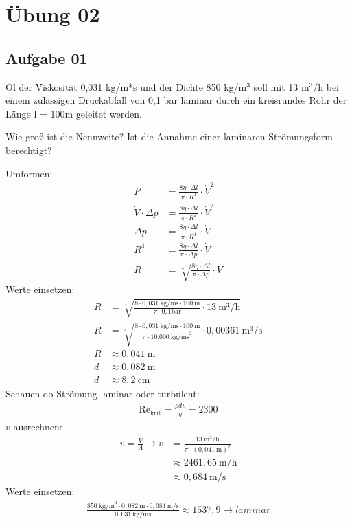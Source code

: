 \documentclass[a4paper,10pt]{article}
\begin{document}
\sidebar
{}
\par \vspace*{5mm}


\section*{Übung 02}
\subsection*{Aufgabe 01}
Öl der Viskosität 0,031 kg/m*s und der Dichte 850 kg/m$^3$ soll mit 13 m$^3$/h bei einem
zulässigen Druckabfall von 0,1 bar laminar durch ein kreisrundes Rohr der Länge
l = 100m geleitet werden. \par 
Wie groß ist die Nennweite? Ist die Annahme einer laminaren Strömungsform
berechtigt?

Umformen:
\begin{align*}
P &= \frac{8 \eta \cdot \Delta l}{\pi \cdot R^4} \cdot \dot{V}^2 \\
\dot{V} \cdot \Delta p &=  \frac{8 \eta \cdot \Delta l}{\pi \cdot R^4} \cdot \dot{V}^2 \\
 \Delta p &=  \frac{8 \eta \cdot \Delta l}{\pi \cdot R^4} \cdot \dot{V} \\
R^4 &=  \frac{8 \eta \cdot \Delta l}{\pi \cdot  \Delta p} \cdot \dot{V} \\
R &= \sqrt[4]{\frac{8 \eta \cdot \Delta l}{\pi \cdot  \Delta p} \cdot \dot{V}}
\end{align*}
Werte einsetzen:
\begin{align*}
R &= \sqrt[4]{\frac{8 \cdot 0,031 ~\text{kg/ms} \cdot 100~\text{m}}{\pi \cdot  0,1 \text{bar}} \cdot 13~\text{m}^3/\text{h}} \\
R &= \sqrt[4]{\frac{8 \cdot 0,031 ~\text{kg/ms} \cdot 100~\text{m}}{\pi \cdot  10.000 ~\text{kg/ms}^2} \cdot 0,00361~\text{m}^3/\text{s}}\\
R &\approx 0,041~\text{m} \\
d &\approx 0,082~\text{m} \\
d &\approx 8,2~\text{cm}
\end{align*}
Schauen ob Strömung laminar oder turbulent:
\begin{align*}
\text{Re}_{\text{krit}} = \frac{\rho d v}{\eta} = 2300
\end{align*}
$v$ ausrechnen:
\begin{align*}
v = \frac{\dot{V}}{A} \rightarrow v &= \frac{13~\text{m}^3/\text{h}}{\pi \cdot (0,041~\text{m})^2} \\
&\approx 2461,65~\text{m/h} \\
&\approx 0,684~\text{m/s} 
\end{align*}
Werte einsetzen:
\begin{align*}
\frac{850~\text{kg/m}^3 \cdot 0,082~\text{m} \cdot 0,684~\text{m/s}}{0,031~\text{kg/ms}} \approx 1537,9 \rightarrow {laminar}
\end{align*}
\end{document}
